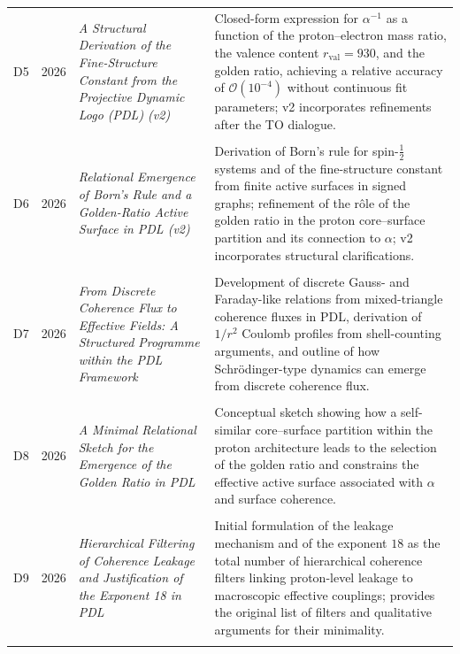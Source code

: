 \documentclass[11pt,a4paper]{article}
\begin{document}
\begin{longtable}{@{}llL{4cm}p{9.5cm}@{}}
D5 & 2026 & \textit{A Structural Derivation of the Fine-Structure Constant from the Projective Dynamic Logo (PDL) (v2)} &
Closed-form expression for $\alpha^{-1}$ as a function of the proton–electron mass ratio, the valence content $r_{\mathrm{val}}=930$, and the golden ratio, achieving a relative accuracy of $\mathcal{O}(10^{-4})$ without continuous fit parameters; v2 incorporates refinements after the TO dialogue. \citep{Alpha_PDL_v2_2026} \\\\[0.5em]

D6 & 2026 & \textit{Relational Emergence of Born's Rule and a Golden-Ratio Active Surface in PDL (v2)} &
Derivation of Born's rule for spin-$\tfrac{1}{2}$ systems and of the fine-structure constant from finite active surfaces in signed graphs; refinement of the rôle of the golden ratio in the proton core–surface partition and its connection to $\alpha$; v2 incorporates structural clarifications. \citep{Born_Golden_v2_2026,Golden_Ratio_Sketch_2026} \\\\[0.5em]

D7 & 2026 & \textit{From Discrete Coherence Flux to Effective Fields: A Structured Programme within the PDL Framework} &
Development of discrete Gauss- and Faraday-like relations from mixed-triangle coherence fluxes in PDL, derivation of $1/r^2$ Coulomb profiles from shell-counting arguments, and outline of how Schr\"odinger-type dynamics can emerge from discrete coherence flux. \citep{Effective_Fields_PDL_2026} \\\\[0.5em]

D8 & 2026 & \textit{A Minimal Relational Sketch for the Emergence of the Golden Ratio in PDL} &
Conceptual sketch showing how a self-similar core–surface partition within the proton architecture leads to the selection of the golden ratio and constrains the effective active surface associated with $\alpha$ and surface coherence. \citep{Golden_Ratio_Sketch_2026} \\\\[0.5em]

D9 & 2026 & \textit{Hierarchical Filtering of Coherence Leakage and Justification of the Exponent 18 in PDL} &
Initial formulation of the leakage mechanism and of the exponent $18$ as the total number of hierarchical coherence filters linking proton-level leakage to macroscopic effective couplings; provides the original list of filters and qualitative arguments for their minimality. \citep{Exponent_18_PDL_2026} \\\\[0.5em]


\end{longtable}
\end{document}
